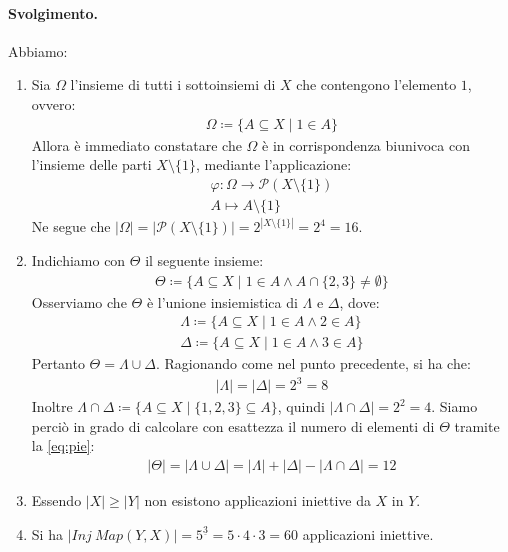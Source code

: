 \paragraph{Svolgimento.} Abbiamo:
\begin{enumerate}
	\item Sia $\Omega$ l'insieme di tutti i sottoinsiemi di $X$ che contengono l'elemento $1$, ovvero:
	\begin{align*}
		\Omega \coloneqq \{A \subseteq X \; | \; 1 \in A\}
	\end{align*}
	Allora è immediato constatare che $\Omega$ è in corrispondenza biunivoca con l'insieme delle parti $X \setminus \{1\}$, mediante l'applicazione:
	\begin{align*}
		\varphi : \Omega \rightarrow \mathcal{P}(X \setminus \{1\})\\
		A \mapsto A \setminus \{1\}
	\end{align*}
	Ne segue che $|\Omega|= |\mathcal{P}(X \setminus \{1\})| = 2^{|X \setminus \{1\}|} = 2^{4} = 16$.
	\item Indichiamo con $\Theta$ il seguente insieme:
	\begin{align*}
		\Theta \coloneqq \{A \subseteq X \; | \; 1 \in A \land A \cap \{2,3\} \neq \emptyset \}
	\end{align*}
	Osserviamo che $\Theta$ è l'unione insiemistica di $\Lambda$ e $\Delta$, dove:
	\begin{align*}
		\Lambda \coloneqq \{ A \subseteq X \; | \; 1 \in A \land 2 \in A \}\\
		\Delta \coloneqq \{A \subseteq X \; | \; 1 \in A \land 3 \in A \}
	\end{align*}
	Pertanto $\Theta = \Lambda \cup \Delta$. Ragionando come nel punto precedente, si ha che:
	\begin{align*}
		|\Lambda|=|\Delta|= 2^{3} = 8
	\end{align*}
	Inoltre $\Lambda \cap \Delta \coloneqq \{A \subseteq X \; | \; \{1,2,3\} \subseteq A\}$, quindi $|\Lambda \cap \Delta|=2^{2}=4$. Siamo perciò in grado di calcolare con esattezza il numero di elementi di $\Theta$ tramite la \ref{eq:pie}:
	\begin{align*}
		|\Theta| = |\Lambda \cup \Delta| = |\Lambda|+|\Delta|-|\Lambda \cap \Delta| =12
	\end{align*}
	\item Essendo $|X| \geq |Y|$ non esistono applicazioni iniettive da $X$ in $Y$.
	\item Si ha $|Inj \ Map(Y,X)| = 5^{\underline{3}} = 5 \cdot 4 \cdot 3 = 60$ applicazioni iniettive.

\end{enumerate}
